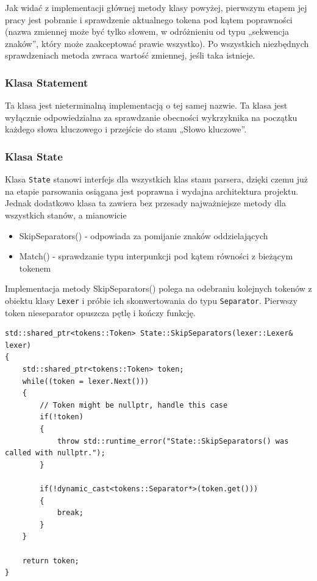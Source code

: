 Jak widać z implementacji głównej metody klasy powyżej, pierwszym etapem jej pracy jest pobranie i sprawdzenie aktualnego tokena pod kątem poprawności (nazwa zmiennej może być tylko słowem, w odróżnieniu od typu „sekwencja znaków”, który może zaakceptować prawie wszystko). Po wszystkich niezbędnych sprawdzeniach metoda zwraca wartość zmiennej, jeśli taka istnieje.

\subsubsection{Klasa Statement}

Ta klasa jest nieterminalną implementacją o tej samej nazwie. Ta klasa jest wyłącznie odpowiedzialna za sprawdzanie obecności wykrzyknika na początku każdego słowa kluczowego i przejście do stanu „Słowo kluczowe”.

\subsubsection{Klasa State}

Klasa \texttt{State} stanowi interfejs dla wszystkich klas stanu parsera, dzięki czemu już na etapie parsowania osiągana jest poprawna i wydajna architektura projektu. Jednak dodatkowo klasa ta zawiera bez przesady najważniejsze metody dla wszystkich stanów, a mianowicie

\begin{itemize}
	\item SkipSeparators() - odpowiada za pomijanie znaków oddzielających
	\item Match() - sprawdzanie typu interpunkcji pod kątem równości z bieżącym tokenem
\end{itemize}

Implementacja metody SkipSeparators() polega na odebraniu kolejnych tokenów z obiektu klasy \texttt{Lexer} i próbie ich skonwertowania do typu \texttt{Separator}. Pierwszy token nieseparator opuszcza pętlę i kończy funkcję.

\begin{lstlisting}[label=list:separator_skip,caption=Metoda State::SkipSeparators(),basicstyle=\footnotesize\ttfamily]
std::shared_ptr<tokens::Token> State::SkipSeparators(lexer::Lexer& lexer)
{
    std::shared_ptr<tokens::Token> token;
    while((token = lexer.Next()))
    {
        // Token might be nullptr, handle this case
        if(!token)
        {
            throw std::runtime_error("State::SkipSeparators() was called with nullptr.");
        }
    
        if(!dynamic_cast<tokens::Separator*>(token.get()))
        {
            break;
        }
    }
    
    return token;
}
\end{lstlisting}


